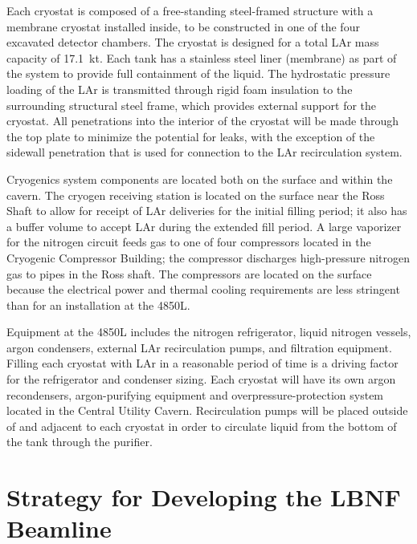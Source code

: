 Each cryostat is composed of a free-standing steel-framed structure with a membrane cryostat %
installed inside, to be constructed in one of the four excavated detector chambers. The cryostat is designed for a total LAr mass capacity of 
17.1~kt. Each tank has a stainless steel liner (membrane) as part of the %
system to provide full containment of the liquid. The hydrostatic pressure loading of the LAr is transmitted through rigid foam insulation to the surrounding structural steel frame, which provides external support for the cryostat. All penetrations into the interior of the cryostat will be made through the top plate to minimize the potential for leaks, with the exception of the sidewall penetration that is used for connection to the LAr recirculation system.
 
Cryogenics system components are located both on the surface and within the cavern. The cryogen receiving station is located on the surface near the Ross Shaft to allow for receipt of LAr deliveries for the initial filling period; it also has a buffer volume to accept LAr during the extended fill period. A large vaporizer for the nitrogen circuit feeds gas to one of four compressors located in the Cryogenic Compressor Building; the compressor discharges high-pressure nitrogen gas to pipes in the Ross shaft. The compressors are located on the surface because the electrical power  and thermal cooling requirements are less stringent than for an installation at the 4850L.  
 
Equipment at the 4850L includes the nitrogen refrigerator, liquid nitrogen vessels, argon condensers, external LAr recirculation pumps, and filtration equipment. Filling each cryostat with LAr in a reasonable period of time is a driving factor for the refrigerator and condenser sizing.  Each cryostat will have its own argon recondensers, argon-purifying equipment and overpressure-protection system located in the Central Utility Cavern. Recirculation pumps will be placed outside of and adjacent to each cryostat in order to circulate liquid from the bottom of the tank through the purifier.
 
\section{Strategy for Developing the LBNF Beamline}
\label{v1ch:tech-designs:beam-strategy}

